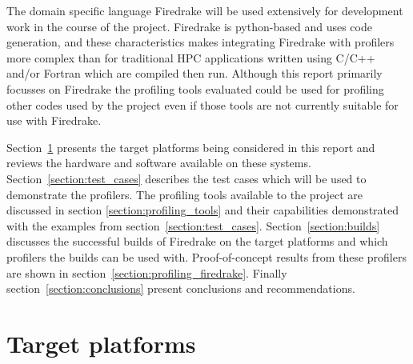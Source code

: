 \documentclass[a4paper,titlepage]{article}
\begin{document}
The domain specific language Firedrake will be used extensively for development work in the course of the project. Firedrake is python-based and uses code generation, and these characteristics makes integrating Firedrake with profilers more complex than for traditional HPC applications written using C/C++ and/or Fortran which are compiled then run. Although this report primarily focusses on Firedrake the profiling tools evaluated could be used for profiling other codes used by the project even if those tools are not currently suitable for use with Firedrake.

Section~\ref{section:target_platforms} presents the target platforms being considered in this report and reviews the hardware and software available on these systems. Section~\ref{section:test_cases} describes the test cases which will be used to demonstrate the profilers. The profiling tools available to the project are discussed in section \ref{section:profiling_tools} and their capabilities demonstrated with the examples from section~\ref{section:test_cases}. Section~\ref{section:builds} discusses the successful builds of Firedrake on the target platforms and which profilers the builds can be used with. Proof-of-concept results from these profilers are shown in section~\ref{section:profiling_firedrake}. Finally section~\ref{section:conclusions} present conclusions and recommendations. 


\section{Target platforms}
\label{section:target_platforms}
\end{document}
